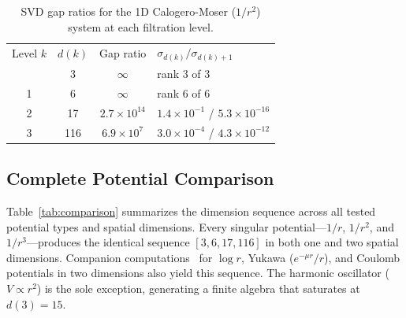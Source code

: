 \documentclass[aps,prl,twocolumn,superscriptaddress,showpacs]{revtex4-2}
\begin{document}
\begin{table}[b]
\caption{SVD gap ratios for the 1D Calogero-Moser ($1/r^2$) system
at each filtration level.}
\label{tab:gaps}
\begin{ruledtabular}
\begin{tabular}{cccl}
Level $k$ & $d(k)$ & Gap ratio & $\sigma_{d(k)} / \sigma_{d(k)+1}$ \\
\colrule
0 & 3  & $\infty$       & rank 3 of 3 \\
1 & 6  & $\infty$       & rank 6 of 6 \\
2 & 17 & $2.7 \times 10^{14}$ & $1.4 \times 10^{-1}$ / $5.3 \times 10^{-16}$ \\
3 & 116 & $6.9 \times 10^{7}$ & $3.0 \times 10^{-4}$ / $4.3 \times 10^{-12}$ \\
\end{tabular}
\end{ruledtabular}
\end{table}

\subsection{Complete Potential Comparison}

Table~\ref{tab:comparison} summarizes the dimension sequence across
all tested potential types and spatial dimensions.  Every singular
potential---$1/r$, $1/r^2$, and $1/r^3$---produces the identical
sequence $[3, 6, 17, 116]$ in both one and two spatial dimensions.
Companion computations~\cite{paper1,paper3} for $\log r$, Yukawa
($e^{-\mu r}/r$), and Coulomb potentials in two dimensions also yield
this sequence.  The harmonic oscillator ($V \propto r^2$) is the sole
exception, generating a finite algebra that saturates at $d(3) = 15$.
\end{document}
